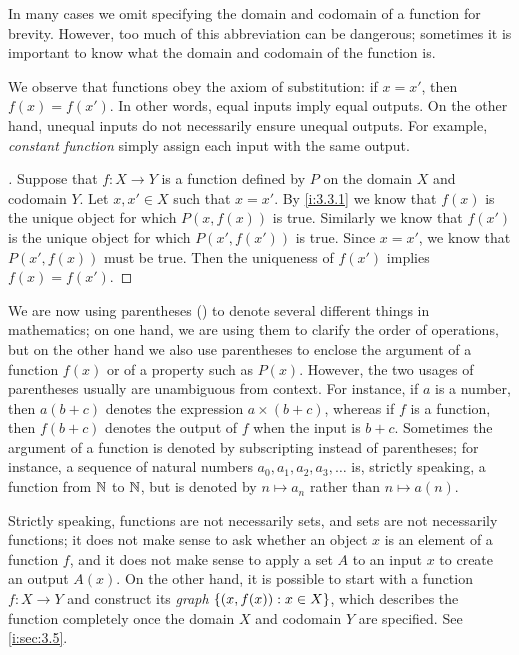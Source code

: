 \begin{note}
  In many cases we omit specifying the domain and codomain of a function for brevity.
  However, too much of this abbreviation can be dangerous;
  sometimes it is important to know what the domain and codomain of the function is.
\end{note}

\begin{ac}\label{i:ac:3.3.1}
  We observe that functions obey the axiom of substitution:
  if \(x = x'\), then \(f(x) = f(x')\).
  In other words, equal inputs imply equal outputs.
  On the other hand, unequal inputs do not necessarily ensure unequal outputs.
  For example, \emph{constant function} simply assign each input with the same output.
\end{ac}

\begin{proof}[]
  Suppose that \(f : X \to Y\) is a function defined by \(P\) on the domain \(X\) and codomain \(Y\).
  Let \(x, x' \in X\) such that \(x = x'\).
  By \cref{i:3.3.1} we know that \(f(x)\) is the unique object for which \(P(x, f(x))\) is true.
  Similarly we know that \(f(x')\) is the unique object for which \(P(x', f(x'))\) is true.
  Since \(x = x'\), we know that \(P(x', f(x))\) must be true.
  Then the uniqueness of \(f(x')\) implies \(f(x) = f(x')\).
\end{proof}

\setcounter{thm}{4}
\begin{rmk}\label{i:3.3.5}
  We are now using parentheses () to denote several different things in mathematics;
  on one hand, we are using them to clarify the order of operations, but on the other hand we also use parentheses to enclose the argument of a function \(f(x)\) or of a property such as \(P(x)\).
  However, the two usages of parentheses usually are unambiguous from context.
  For instance, if \(a\) is a number, then \(a(b + c)\) denotes the expression \(a \times (b + c)\), whereas if \(f\) is a function, then \(f(b + c)\) denotes the output of \(f\) when the input is \(b + c\).
  Sometimes the argument of a function is denoted by subscripting instead of parentheses;
  for instance, a sequence of natural numbers \(a_0, a_1, a_2, a_3, \dots\) is, strictly speaking, a function from \(\mathbb{N}\) to \(\mathbb{N}\), but is denoted by \(n \mapsto a_n\) rather than \(n \mapsto a(n)\).
\end{rmk}

\begin{rmk}\label{i:3.3.6}
  Strictly speaking, functions are not necessarily sets, and sets are not necessarily functions;
  it does not make sense to ask whether an object \(x\) is an element of a function \(f\), and it does not make sense to apply a set \(A\) to an input \(x\) to create an output \(A(x)\).
  On the other hand, it is possible to start with a function \(f : X \to Y\) and construct its \emph{graph} \(\left\lbrace(x, f(x)) : x \in X\right\rbrace\), which describes the function completely once the domain \(X\) and codomain \(Y\) are specified.
  See \cref{i:sec:3.5}.
\end{rmk}


